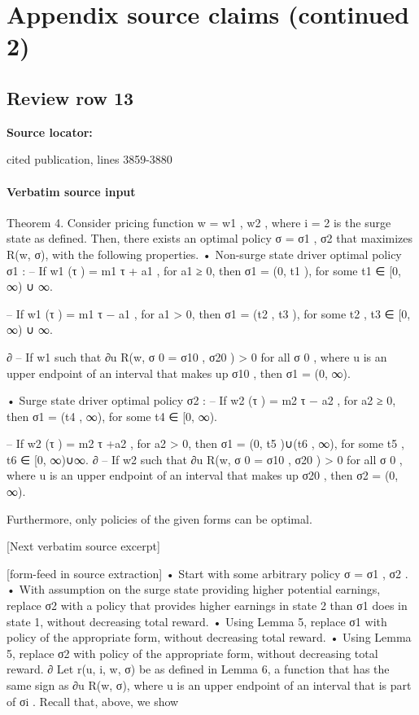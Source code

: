 \documentclass[10pt]{article}
\begin{document}
\section*{Appendix source claims (continued 2)}
\subsection*{Review row 13}
\textbf{Source locator:} {\footnotesize\raggedright cited publication, lines 3859-\allowbreak{}3880\par}
\paragraph{Verbatim source input}
\begin{ReviewVerbatim}
Theorem 4. Consider pricing function w = {w1 , w2 }, where i = 2 is the surge state as defined.
Then, there exists an optimal policy σ = {σ1 , σ2 } that maximizes R(w, σ), with the following properties.
• Non-surge state driver optimal policy σ1 :
– If w1 (τ ) = m1 τ + a1 , for a1 ≥ 0, then σ1 = (0, t1 ), for some t1 ∈ [0, ∞) ∪ {∞}.

– If w1 (τ ) = m1 τ − a1 , for a1 > 0, then σ1 = (t2 , t3 ), for some t2 , t3 ∈ [0, ∞) ∪ {∞}.

∂
– If w1 such that ∂u
R(w, σ 0 = {σ10 , σ20 }) > 0 for all σ 0 , where u is an upper endpoint of an
interval that makes up σ10 , then σ1 = (0, ∞).

• Surge state driver optimal policy σ2 :
– If w2 (τ ) = m2 τ − a2 , for a2 ≥ 0, then σ1 = (t4 , ∞), for some t4 ∈ [0, ∞).

– If w2 (τ ) = m2 τ +a2 , for a2 > 0, then σ1 = (0, t5 )∪(t6 , ∞), for some t5 , t6 ∈ [0, ∞)∪{∞}.
∂
– If w2 such that ∂u
R(w, σ 0 = {σ10 , σ20 }) > 0 for all σ 0 , where u is an upper endpoint of an
interval that makes up σ20 , then σ2 = (0, ∞).

Furthermore, only policies of the given forms can be optimal.

[Next verbatim source excerpt]


[form-feed in source extraction]
• Start with some arbitrary policy σ = {σ1 , σ2 }.
• With assumption on the surge state providing higher potential earnings, replace σ2 with a
policy that provides higher earnings in state 2 than σ1 does in state 1, without decreasing
total reward.
• Using Lemma 5, replace σ1 with policy of the appropriate form, without decreasing total
reward.
• Using Lemma 5, replace σ2 with policy of the appropriate form, without decreasing total
reward.
∂
Let r(u, i, w, σ) be as defined in Lemma 6, a function that has the same sign as ∂u
R(w, σ),
where u is an upper endpoint of an interval that is part of σi . Recall that, above, we show


\end{ReviewVerbatim}
\end{document}

